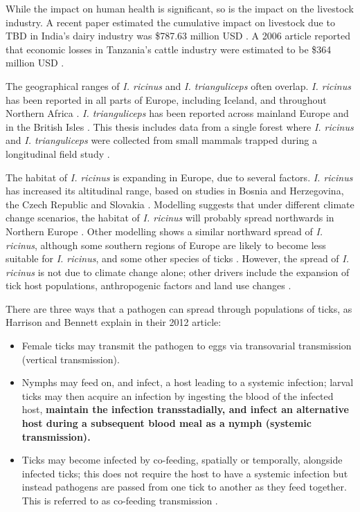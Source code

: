\documentclass{article}
\begin{document}
While the impact on human health is significant, so is the impact on the livestock industry. A recent paper estimated the cumulative impact on livestock due to TBD in India's dairy industry was \$787.63 million USD \cite{Singh2022}. A 2006 article reported that economic losses in Tanzania's cattle industry were estimated to be \$364 million USD \cite{Kivaria2006}.

The geographical ranges of \textit{I. ricinus} and \textit{I. trianguliceps} often overlap. \textit{I. ricinus} has been reported in all parts of Europe, including Iceland, and throughout Northern Africa \cite{Otranto_2017}. \textit{I. trianguliceps} has been reported across mainland Europe and in the British Isles \cite{Pf_ffle_2017}. This thesis includes data from a single forest where \textit{I. ricinus} and \textit{I. trianguliceps} were collected from small mammals trapped during a longitudinal field study \cite{Bown2008, Bown2011}.

The habitat of \textit{I. ricinus} is expanding in Europe, due to several factors. \textit{I. ricinus} has increased its altitudinal range, based on studies in Bosnia and Herzegovina, the Czech Republic and Slovakia \cite{Medlock2013}. Modelling suggests that under different climate change scenarios, the habitat of \textit{I. ricinus} will probably spread northwards in Northern Europe \cite{Alkishe_2017}. Other modelling shows a similar northward spread of \textit{I. ricinus}, although some southern regions of Europe are likely to become less suitable for \textit{I. ricinus}, and some other species of ticks \cite{Cunze_2022}. However, the spread of \textit{I. ricinus} is not due to climate change alone; other drivers include the expansion of tick host populations, anthropogenic factors and land use changes \cite{Medlock2013}.

There are three ways that a pathogen can spread through populations of ticks, as Harrison and Bennett explain in their 2012 article:
\begin{itemize}
	\item Female ticks may transmit the pathogen to eggs via transovarial transmission (vertical transmission).
	\item Nymphs may feed on, and infect, a host leading to a systemic infection; larval ticks may then acquire an infection by ingesting the blood of the infected host, \textbf{maintain the infection transstadially, and infect an alternative host during a subsequent blood meal as a nymph (systemic transmission).}
	\item Ticks may become infected by co-feeding, spatially or temporally, alongside infected ticks; this does not require the host to have a systemic infection but instead pathogens are passed from one tick to another as they feed together. This is referred to as co-feeding transmission \cite{HARRISON2012}.
\end{itemize}
\end{document}
